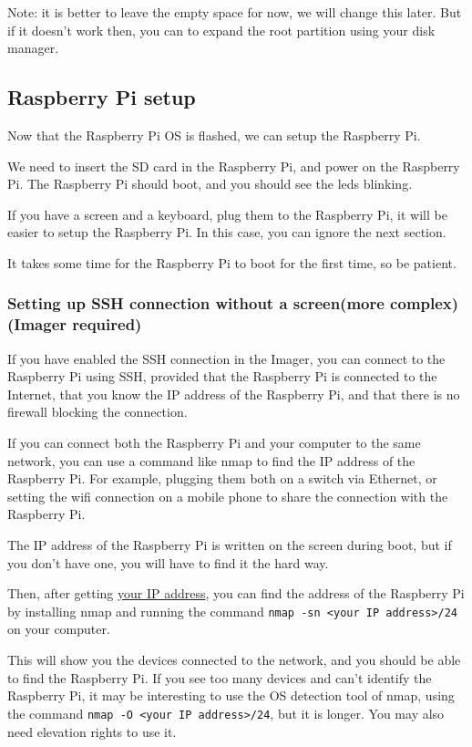\documentclass{article}
\begin{document}
Note: it is better to leave the empty space for now, we will change this later. But if it doesn't
work then, you can to expand the root partition using your disk manager.

\subsection{Raspberry Pi setup}

Now that the Raspberry Pi OS is flashed, we can setup the Raspberry Pi.

We need to insert the SD card in the Raspberry Pi, and power on the Raspberry Pi.
The Raspberry Pi should boot, and you should see the leds blinking.

If you have a screen and a keyboard, plug them to the Raspberry Pi, it will be easier to setup the
Raspberry Pi. In this case, you can ignore the next section.

It takes some time for the Raspberry Pi to boot for the first time, so be patient.

\subsubsection{Setting up SSH connection without a screen(more complex)(Imager required)}

If you have enabled the SSH connection in the Imager, you can connect to the Raspberry Pi using
SSH, provided that the Raspberry Pi is connected to the Internet, that you know the IP address of
the Raspberry Pi, and that there is no firewall blocking the connection.

If you can connect both the Raspberry Pi and your computer to the same network, you can use a
command like nmap to find the IP address of the Raspberry Pi.
For example, plugging them both on a switch via Ethernet, or setting the wifi connection on a
mobile phone to share the connection with the Raspberry Pi.

The IP address of the Raspberry Pi is written on the screen during boot, but if you don't have one,
you will have to find it the hard way.

Then, after getting \href{https://www.whatismyip.com/}{your IP address}, you can find the address
of the Raspberry Pi by installing nmap and running the command
\texttt{nmap -sn <your IP address>/24} on your computer.

This will show you the devices connected to the network, and you should be able to find the
Raspberry Pi.
If you see too many devices and can't identify the Raspberry Pi, it may be interesting to use the
OS detection tool of nmap, using the command \texttt{nmap -O <your IP address>/24}, but it is
longer. You may also need elevation rights to use it.
\end{document}
